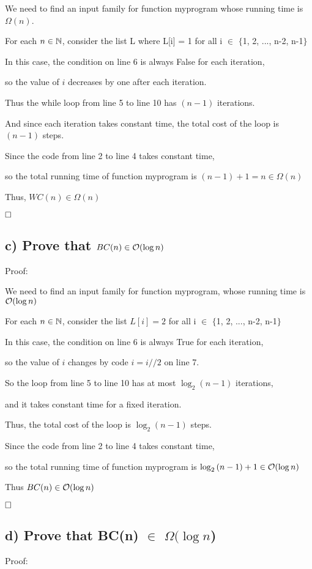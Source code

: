 \documentclass[12pt]{article}
\begin{document}
We need to find an input family for function myprogram whose running time is $\Omega(n)$.

For each $n \in \mathbb N$, consider the list L where L[i] = 1 for all i $\in$ $\{$1, 2, ..., n-2, n-1$\}$

In this case, the condition on line 6 is always False for each iteration,

so the value of $i$ decreases by one after each iteration.

Thus the while loop from line 5 to line 10 has $(n-1)$ iterations.

And since each iteration takes constant time, the total cost of the loop is $(n-1)$ steps.

Since the code from line 2 to line 4 takes constant time, 

so the total running time of function myprogram is $(n-1)+1=n \in \Omega(n)$

Thus, $WC(n) \in \Omega(n)$


$\hfill\square$ 
\newpage

\subsection*{c) Prove that $BC(n) \in \mathcal O(\log{n})$}
\vspace{20pt}
Proof:

We need to find an input family for function myprogram, whose running time is $\mathcal O(\log{n})$

For each $n \in \mathbb N$, consider the list $L[i] = 2$ for all i $\in$ $\{$1, 2, ..., n-2, n-1$\}$

In this case, the condition on line 6 is always True for each iteration,

so the value of $i$ changes by code $i = i // 2$ on line 7.

So the loop from line 5 to line 10 has at most $\log_2{(n-1)}$ iterations, 

and it takes constant time for a fixed iteration.

Thus, the total cost of the loop is $\log_2{(n-1)}$ steps.

Since the code from line 2 to line 4 takes constant time,

so the total running time of function myprogram is $\log_2{(n-1)+1} \in \mathcal O(\log{n})$

Thus $BC(n) \in \mathcal O(\log{n})$


$\hfill\square$ 
\vspace{20pt}

\subsection*{d) Prove that BC(n) $\in$ $\Omega(\log{n}$)}
\vspace{20pt}
Proof:
\end{document}
